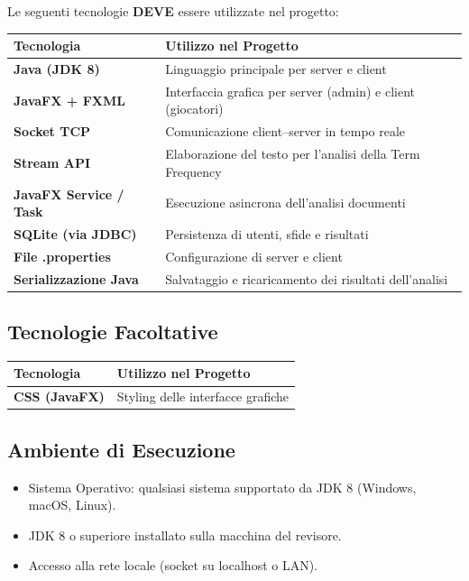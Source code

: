 \documentclass[12pt, a4paper]{article}
\newcommand{\mustshall}{\textbf{DEVE}}
\begin{document}
Le seguenti tecnologie \mustshall{} essere utilizzate nel progetto:

\begin{longtable}{|p{4cm}|p{9cm}|}
    \hline
    \rowcolor{primaryBlue!20}
    \textbf{Tecnologia} & \textbf{Utilizzo nel Progetto} \\
    \hline
    \endhead
    \textbf{Java (JDK 8)} & Linguaggio principale per server e client \\
    \hline
    \textbf{JavaFX + FXML} & Interfaccia grafica per server (admin) e client (giocatori) \\
    \hline
    \textbf{Socket TCP} & Comunicazione client–server in tempo reale \\
    \hline
    \textbf{Stream API} & Elaborazione del testo per l'analisi della Term Frequency \\
    \hline
    \textbf{JavaFX Service / Task} & Esecuzione asincrona dell'analisi documenti \\
    \hline
    \textbf{SQLite (via JDBC)} & Persistenza di utenti, sfide e risultati \\
    \hline
    \textbf{File .properties} & Configurazione di server e client \\
    \hline
    \textbf{Serializzazione Java} & Salvataggio e ricaricamento dei risultati dell'analisi \\
    \hline
\end{longtable}

\subsection{Tecnologie Facoltative}

\begin{longtable}{|p{4cm}|p{9cm}|}
    \hline
    \rowcolor{primaryBlue!20}
    \textbf{Tecnologia} & \textbf{Utilizzo nel Progetto} \\
    \hline
    \endhead
    \textbf{CSS (JavaFX)} & Styling delle interfacce grafiche \\
    \hline
\end{longtable}

\subsection{Ambiente di Esecuzione}

\begin{itemize}[leftmargin=*]
    \item Sistema Operativo: qualsiasi sistema supportato da JDK 8 (Windows, macOS, Linux).
    \item JDK 8 o superiore installato sulla macchina del revisore.
    \item Accesso alla rete locale (socket su localhost o LAN).
\end{itemize}
\end{document}
